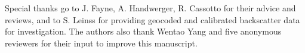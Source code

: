 \documentclass[nhess, manuscript]{copernicus}
\begin{document}

\begin{acknowledgements}
Special thanks go to J. Fayne, A. Handwerger, R. Cassotto for their advice and reviews, and to S. Leinss for providing geocoded and calibrated backscatter data for investigation. The authors also thank Wentao Yang and five anonymous reviewers for their input to improve this manuscript. 
\end{acknowledgements}





















\end{document}

